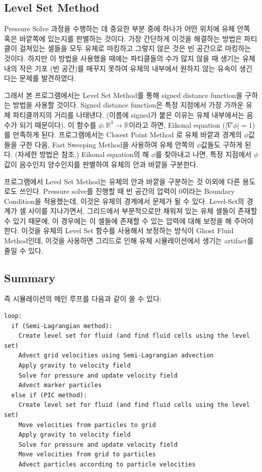 \documentclass[10pt, A4]{article}
\begin{document}
\subsection{Level Set Method}

Pressure Solve 과정을 수행하는 데 중요한 부분 중에 하나가 어떤 위치에 유체 안쪽 혹은 바깥쪽에 있는지를 판별하는 것이다. 가장 간단하게 이것을 해결하는 방법은 파티클이 걸쳐있는 셀들을 모두 유체로 마킹하고 그렇지 않은 것은 빈 공간으로 마킹하는 것이다. 하지만 이 방법을 사용했을 때에는 파티클들의 수가 많지 않을 때 생기는 유체 내의 작은 기포 (빈 공간)를 매꾸지 못하여 유체의 내부에서 원하지 않는 유속이 생긴다는 문제를 발견하였다.

그래서 본 프로그램에서는 Level Set Method를 통해 signed distance function을 구하는 방법을 사용할 것이다. Signed distance function은 특정 지점에서 가장 가까운 유체 파티클까지의 거리를 나태낸다. (이름에 signed가 붙은 이유는 유체 내부에서는 음수가 되기 때문이다). 이 함수를 $\phi: \mathbb{R}^3 \rightarrow \mathbb{R}$이라고 하면, Eikonal equation ($|\nabla \phi| = 1$)를 만족하게 된다. 프로그램에서는 Closest Point Method \cite[p.11]{dist-function}로 유체 바깥과 경계의 $\phi$값들을 구한 다음, Fast Sweeping Method\cite{fast-sweeping}을 사용하여 유체 안쪽의 $\phi$값들도 구하게 된다. (자세한 방법은 \cite[p.49-p.56, p.126]{fluid-sim-cg} 참조.) Eikonal equation의 해 $\phi$를 찾아내고 나면, 특정 지점에서 $\phi$값이 음수인지 양수인지를 판별하여 유체의 안과 바깥을 구분한다.

프로그램에서 Level Set Method는 유체의 안과 바깥을 구분하는 것 이외에 다른 용도로도 쓰인다. Pressure solve를 진행할 때 빈 공간의 압력이 0이라는 Boundary Condition을 적용했는데, 이것은 유체의 경계에서 문제가 될 수 있다. Level-Set의 경계가 셀 사이를 지나가면서, 그리드에서 부분적으로만 채워져 있는 유체 셀들이 존재할 수 있기 때문에, 이 경우에는 이 셀들에 존재할 수 있는 압력에 대해 보정을 해 주어야 한다. 이것을 유체의 Level Set 함수를 사용해서 보정하는 방식이 Ghost Fluid Method인데, 이것을 사용하면 그리드로 인해 유체 시뮬레이션에서 생기는 artifact를 줄일 수 있다. \cite[p.127-129]{fluid-sim-cg}

\subsection{Summary}

즉 시뮬레이션의 메인 루프를 다음과 같이 쓸 수 있다:

\begin{verbatim}
loop:
  if (Semi-Lagrangian method):
    Create level set for fluid (and find fluid cells using the level set)
    Advect grid velocities using Semi-Lagrangian advection 
    Apply gravity to velocity field
    Solve for pressure and update velocity field
    Advect marker particles
  else if (PIC method):
    Create level set for fluid (and find fluid cells using the level set)
    Move velocities from particles to grid
    Apply gravity to velocity field
    Solve for pressure and update velocity field
    Move velocities from grid to particles
    Advect particles according to particle velocities
\end{verbatim}
\end{document}
